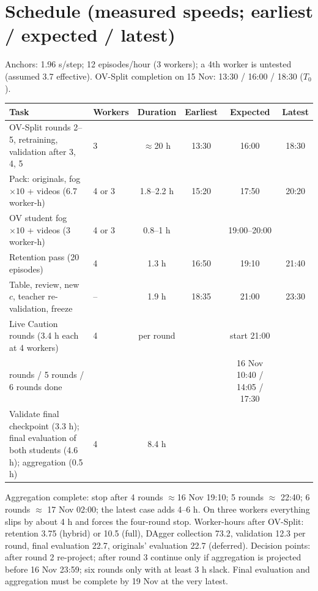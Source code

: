 \documentclass[10.5pt,a4paper]{article}
\begin{document}
\section{Schedule (measured speeds; earliest / expected / latest)}
Anchors: 1.96 s/step; 12 episodes/hour (3 workers); a 4th worker is untested (assumed 3.7 effective). OV-Split completion on 15 Nov: 13:30 / 16:00 / 18:30 ($T_0$).
\begin{center}\footnotesize\begin{tabular}{@{}p{6cm}lcccc@{}}\toprule
Task & Workers & Duration & Earliest & Expected & Latest\\\midrule
OV-Split rounds 2--5, retraining, validation after 3, 4, 5 & 3 & $\approx$20 h & 13:30 & 16:00 & 18:30\\
Pack: originals, fog $\times10$ + videos (6.7 worker-h) & 4 or 3 & 1.8--2.2 h & 15:20 & 17:50 & 20:20\\
OV student fog $\times10$ + videos (3 worker-h) & 4 or 3 & 0.8--1 h & & 19:00--20:00 & \\
Retention pass (20 episodes) & 4 & 1.3 h & 16:50 & 19:10 & 21:40\\
Table, review, new $c$, teacher re-validation, freeze & -- & 1.9 h & 18:35 & 21:00 & 23:30\\
Live Caution rounds (3.4 h each at 4 workers) & 4 & per round & & start 21:00 & \\
\quad 4 rounds / 5 rounds / 6 rounds done & & & & 16 Nov 10:40 / 14:05 / 17:30 & \\
Validate final checkpoint (3.3 h); final evaluation of both students (4.6 h); aggregation (0.5 h) & 4 & 8.4 h & & & \\\bottomrule\end{tabular}\end{center}
Aggregation complete: stop after 4 rounds $\approx$16 Nov 19:10; 5 rounds $\approx$ 22:40; 6 rounds $\approx$ 17 Nov 02:00; the latest case adds 4--6 h. On three workers everything slips by about 4 h and forces the four-round stop. Worker-hours after OV-Split: retention 3.75 (hybrid) or 10.5 (full), DAgger collection 73.2, validation 12.3 per round, final evaluation 22.7, originals' evaluation 22.7 (deferred). Decision points: after round 2 re-project; after round 3 continue only if aggregation is projected before 16 Nov 23:59; six rounds only with at least 3 h slack. Final evaluation and aggregation must be complete by 19 Nov at the very latest.
\end{document}
